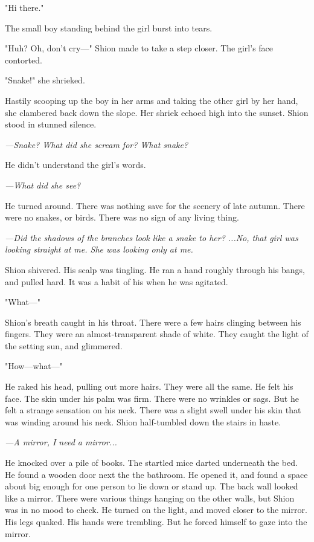 "Hi there."

The small boy standing behind the girl burst into tears.

"Huh? Oh, don't cry---" Shion made to take a step closer. The girl's face
contorted.

"Snake!" she shrieked.

Hastily scooping up the boy in her arms and taking the other girl by her
hand, she clambered back down the slope. Her shriek echoed high into the
sunset. Shion stood in stunned silence.

\emph{---Snake? What did she scream for? What snake?}

He didn't understand the girl's words.

\emph{---What did she see?}

He turned around. There was nothing save for the scenery of late autumn.
There were no snakes, or birds. There was no sign of any living thing.

\emph{---Did the shadows of the branches look like a snake to her? ...No, that
girl was looking straight at me. She was looking only at me.}

Shion shivered. His scalp was tingling. He ran a hand roughly through
his bangs, and pulled hard. It was a habit of his when he was agitated.

"What---"

Shion's breath caught in his throat. There were a few hairs clinging
between his fingers. They were an almost-transparent shade of white.
They caught the light of the setting sun, and glimmered.

"How---what---"

He raked his head, pulling out more hairs. They were all the same. He
felt his face. The skin under his palm was firm. There were no wrinkles
or sags. But he felt a strange sensation on his neck. There was a slight
swell under his skin that was winding around his neck. Shion
half-tumbled down the stairs in haste.

\emph{---A mirror, I need a mirror...}

He knocked over a pile of books. The startled mice darted underneath the
bed. He found a wooden door next the the bathroom. He opened it, and
found a space about big enough for one person to lie down or stand up.
The back wall looked like a mirror. There were various things hanging on
the other walls, but Shion was in no mood to check. He turned on the
light, and moved closer to the mirror. His legs quaked. His hands were
trembling. But he forced himself to gaze into the mirror.

